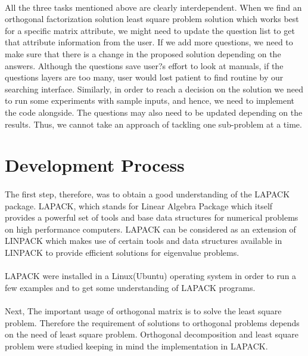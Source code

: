 \documentclass[pdftex,12pt,a4paper]{article}
\begin{document}
\paragraph{}
All the three tasks mentioned above are clearly interdependent. When we find an orthogonal factorization solution least square problem solution which works best for a specific matrix attribute, we might need to update the question list to get that attribute information from the user. If we add more questions, we need to make sure that there is a change in the proposed solution depending on the answers. Although the questions save user?s effort to look at manuals, if the questions layers are too many, user would lost patient to find routine by our searching interface. 
Similarly, in order to reach a decision on the solution we need to run some experiments with sample inputs, and hence, we need to implement the code alongside. The questions may also need to be updated depending on the results. Thus, we cannot take an approach of tackling one sub-problem at a time. 


\section {Development Process}
\paragraph{}
The first step, therefore, was to obtain a good understanding of the LAPACK package. LAPACK, which stands for Linear Algebra Package which itself provides a powerful set of tools and base data structures for numerical problems on high performance computers. LAPACK can be considered as an extension of LINPACK which makes use of certain tools and data structures available in LINPACK to provide efficient solutions for eigenvalue problems. 
\paragraph{}			
LAPACK were installed in a Linux(Ubuntu) operating system in order to run a few examples and to get some understanding of LAPACK programs.
\paragraph{}					
Next, The important usage of orthogonal matrix is to solve the least square problem. Therefore the requirement of solutions to orthogonal problems depends on the need of least square problem. Orthogonal decomposition and least square problem  were studied keeping in mind the implementation in LAPACK.
\end{document}
